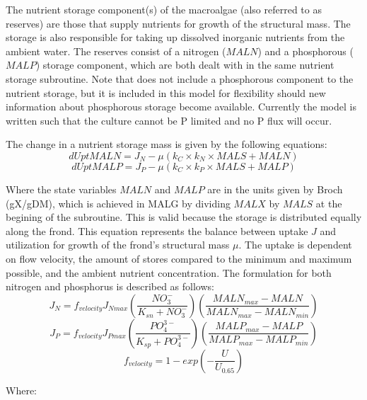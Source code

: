 \documentclass{deltares_manual}
\begin{document}
The nutrient storage component(s) of the macroalgae (also referred to as reserves) are those that supply nutrients for growth of the structural mass. The storage is also responsible for taking up dissolved inorganic nutrients from the ambient water. The reserves consist of a nitrogen ($MALN$) and a phosphorous ($MALP$) storage component, which are both dealt with in the same nutrient storage subroutine. Note that \cite{broch2012} does not include a phosphorous component to the nutrient storage, but it is included in this model for flexibility should new information about phosphorous storage become available. Currently the model is written such that the culture cannot be P limited and no P flux will occur.

The change in a nutrient storage mass is given by the following equations:
\begin{equation}
dUptMALN = J_N - \mu(k_C \times k_N \times MALS + MALN)
\end{equation}
\begin{equation}
dUptMALP = J_P - \mu(k_C \times k_P \times MALS + MALP)
\end{equation}

Where the state variables $MALN$ and $MALP$ are in the units given by Broch (gX/gDM), which is achieved in MALG by dividing $MALX$ by $MALS$ at the begining of the subroutine. This is valid because the storage is distributed equally along the frond. This equation represents the balance between uptake $J$ and utilization for growth of the frond's structural mass $\mu$. The uptake is dependent on flow velocity, the amount of stores compared to the minimum and maximum possible, and the ambient nutrient concentration. The formulation for both nitrogen and phosphorus is described as follows:
\begin{equation}
J_N = f_{velocity}J_{Nmax}(\frac{NO_3^-}{K_{sn}+NO_3^-})(\frac{MALN_{max}-MALN}{MALN_{max}-MALN_{min}})
\end{equation}
\begin{equation}
J_P = f_{velocity}J_{Pmax}(\frac{PO_4^{3-}}{K_{sp}+PO_4^{3-}})(\frac{MALP_{max}-MALP}{MALP_{max}-MALP_{min}})
\end{equation}
\begin{equation}
f_{velocity} = 1-exp(-\frac{U}{U_{0.65}})
\end{equation}

Where:\\
\end{document}
